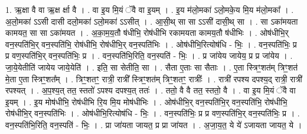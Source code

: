 \documentclass[17pt]{extarticle}
\begin{document}
1. ऋ॒क्षा वै वा ऋ॒क्ष र्क्षा वै । . वा इ॒य मि॒यं ॅवै वा इ॒यम् । . इ॒य म॑लो॒मका॑ ऽलो॒मके॒य मि॒य म॑लो॒मका᳚ । . अ॒लो॒मका॑ ऽऽसी दासी दलो॒मका॑ ऽलो॒मका॑ ऽऽसीत् । . आ॒सी॒थ् सा सा ऽऽसी॑ दासी॒थ् सा । . सा ऽका॑मयता कामयत॒ सा सा ऽका॑मयत । . अ॒का॒म॒य॒तौ ष॑धीभि॒ रोष॑धीभि रकामयता कामय॒तौ ष॑धीभिः । . ओष॑धीभि॒र् वन॒स्पति॑भि॒र् वन॒स्पति॑भि॒ रोष॑धीभि॒ रोष॑धीभि॒र् वन॒स्पति॑भिः । . ओष॑धीभि॒रित्योष॑धि - भिः॒ । . वन॒स्पति॑भिः॒ प्र प्र वण॒स्पति॑भि॒र् वन॒स्पति॑भिः॒ प्र । . वन॒स्पति॑भि॒रिति॒ वन॒स्पति॑ - भिः॒ । . प्र जा॑येय जायेय॒ प्र प्र जा॑येय । . जा॒ये॒येतीति॑ जायेय जाये॒येति॑ । . इति॒ सा सेतीति॒ सा । . सैता ए॒ताः सा सैताः । . ए॒ता स्त्रिꣳ॒॒शत॑म् त्रिꣳ॒॒शत॑ मे॒ता ए॒ता स्त्रिꣳ॒॒शत᳚म् । . त्रिꣳ॒॒शतꣳ॒॒ रात्री॒ रात्री᳚ स्त्रिꣳ॒॒शत॑म् त्रिꣳ॒॒शतꣳ॒॒ रात्रीः᳚ । . रात्री॑ रपश्य दपश्य॒द् रात्री॒ रात्री॑ रपश्यत् । . अ॒प॒श्य॒त् तत॒ स्ततो॑ ऽपश्य दपश्य॒त् ततः॑ । . ततो॒ वै वै तत॒ स्ततो॒ वै । . वा इ॒य मि॒यं ॅवै वा इ॒यम् । . इ॒य मोष॑धीभि॒ रोष॑धीभि रि॒य मि॒य मोष॑धीभिः । . ओष॑धीभि॒र् वन॒स्पति॑भि॒र् वन॒स्पति॑भि॒ रोष॑धीभि॒ रोष॑धीभि॒र् वन॒स्पति॑भिः । . ओष॑धीभि॒रित्योष॑धि - भिः॒ । . वन॒स्पति॑भिः॒ प्र प्र वण॒स्पति॑भि॒र् वन॒स्पति॑भिः॒ प्र । . वन॒स्पति॑भि॒रिति॒ वन॒स्पति॑ - भिः॒ । . प्रा जा॑यता जायत॒ प्र प्रा जा॑यत । . अ॒जा॒य॒त॒ ये ये॑ ऽजायता जायत॒ ये । \newline
\end{document}
